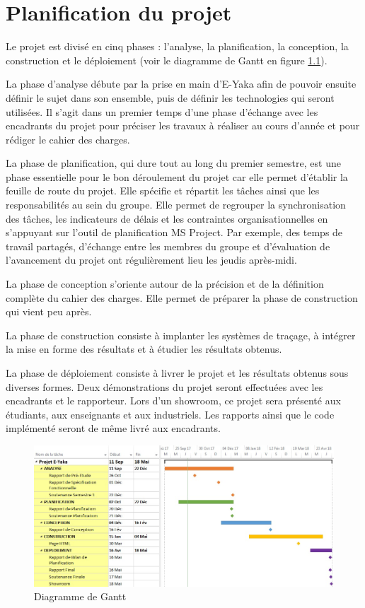 \chapter{Planification du projet}

Le projet est divisé en cinq phases : l'analyse, la planification, la conception, la construction et le déploiement (voir le diagramme de Gantt en figure \ref{gantt_1}).

La phase d'analyse débute par la prise en main d'E-Yaka afin de pouvoir ensuite définir le sujet dans son ensemble, puis de définir les technologies qui seront utilisées. Il s'agit dans un premier temps d'une phase d'échange avec les encadrants du projet pour préciser les travaux à réaliser au cours d'année et pour rédiger le cahier des charges.

La phase de planification, qui dure tout au long du premier semestre, est une phase essentielle pour le bon déroulement du projet car elle permet d’établir la feuille de route du projet. Elle spécifie et répartit les tâches ainsi que les responsabilités au sein du groupe. Elle permet de regrouper la synchronisation des tâches, les indicateurs de délais et les contraintes organisationnelles en s'appuyant sur l’outil de planification MS Project. Par exemple, des temps de travail partagés, d'échange entre les membres du groupe et d'évaluation de l'avancement du projet ont régulièrement lieu les jeudis après-midi.

La phase de conception s'oriente autour de la précision et de la définition complète du cahier des charges. Elle permet de préparer la phase de construction qui vient peu après.

La phase de construction consiste à implanter les systèmes de traçage, à intégrer la mise en forme des résultats et à étudier les résultats obtenus.

La phase de déploiement consiste à livrer le projet et les résultats obtenus sous diverses formes. Deux démonstrations du projet seront effectuées avec les encadrants et le rapporteur. Lors d’un showroom, ce projet sera présenté aux étudiants, aux enseignants et aux industriels. Les rapports ainsi que le code implémenté seront de même livré aux encadrants.


  \begin{figure}
    \includegraphics[width=1\textwidth]{images/gantt1.jpg}
    \caption{Diagramme de Gantt}
    \label{gantt_1}
  \end{figure}
